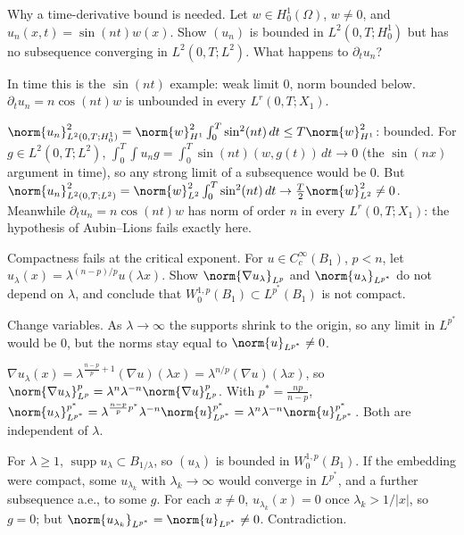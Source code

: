 \begin{exercise}
  Why a time-derivative bound is needed. Let $w \in H^1_0(\Omega)$, $w \ne 0$, and $u_n(x,t) = \sin(nt)w(x)$. Show $(u_n)$ is bounded in $L^2(0,T;H^1_0)$ but has no subsequence converging in $L^2(0,T;L^2)$. What happens to $\partial_t u_n$?
  \begin{hint}
    In time this is the $\sin(nt)$ example: weak limit $0$, norm bounded below. $\partial_t u_n = n\cos(nt)w$ is unbounded in every $L^r(0,T;X_1)$.
  \end{hint}
  \begin{solution}
    $\norm{u_n}_{L^2(0,T;H^1_0)}^2 = \norm{w}_{H^1}^2\int_0^T\sin^2(nt)\,dt \le T\norm{w}_{H^1}^2$: bounded. For $g \in L^2(0,T;L^2)$, $\int_0^T\!\!\int u_ng = \int_0^T\sin(nt)(w, g(t))\,dt \to 0$ (the $\sin(nx)$ argument in time), so any strong limit of a subsequence would be $0$. But $\norm{u_n}_{L^2(0,T;L^2)}^2 = \norm{w}_{L^2}^2\int_0^T\sin^2(nt)\,dt \to \frac T2\norm{w}_{L^2}^2 \ne 0$. Meanwhile $\partial_tu_n = n\cos(nt)w$ has norm of order $n$ in every $L^r(0,T;X_1)$: the hypothesis of Aubin--Lions fails exactly here.
  \end{solution}
\end{exercise}

\begin{exercise}
  Compactness fails at the critical exponent. For $u \in C_c^\infty(B_1)$, $p < n$, let $u_\lambda(x) = \lambda^{(n-p)/p}u(\lambda x)$. Show $\norm{\nabla u_\lambda}_{L^p}$ and $\norm{u_\lambda}_{L^{p^*}}$ do not depend on $\lambda$, and conclude that $W^{1,p}_0(B_1) \subset L^{p^*}(B_1)$ is not compact.
  \begin{hint}
    Change variables. As $\lambda \to \infty$ the supports shrink to the origin, so any limit in $L^{p^*}$ would be $0$, but the norms stay equal to $\norm{u}_{L^{p^*}} \ne 0$.
  \end{hint}
  \begin{solution}
    $\nabla u_\lambda(x) = \lambda^{\frac{n-p}{p}+1}(\nabla u)(\lambda x) = \lambda^{n/p}(\nabla u)(\lambda x)$, so $\norm{\nabla u_\lambda}_{L^p}^p = \lambda^n\lambda^{-n}\norm{\nabla u}_{L^p}^p$. With $p^* = \frac{np}{n-p}$, $\norm{u_\lambda}_{L^{p^*}}^{p^*} = \lambda^{\frac{n-p}{p}p^*}\lambda^{-n}\norm{u}_{L^{p^*}}^{p^*} = \lambda^n\lambda^{-n}\norm{u}_{L^{p^*}}^{p^*}$. Both are independent of $\lambda$.

    For $\lambda \ge 1$, $\operatorname{supp}u_\lambda \subset B_{1/\lambda}$, so $(u_\lambda)$ is bounded in $W^{1,p}_0(B_1)$. If the embedding were compact, some $u_{\lambda_k}$ with $\lambda_k \to \infty$ would converge in $L^{p^*}$, and a further subsequence a.e., to some $g$. For each $x \ne 0$, $u_{\lambda_k}(x) = 0$ once $\lambda_k > 1/|x|$, so $g = 0$; but $\norm{u_{\lambda_k}}_{L^{p^*}} = \norm{u}_{L^{p^*}} \ne 0$. Contradiction.
  \end{solution}
\end{exercise}

